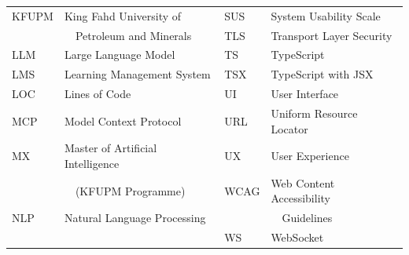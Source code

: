 \begin{tabular}{@{}l p{5.6cm} l p{5.6cm}@{}}
KFUPM & King Fahd University of                    & SUS   & System Usability Scale \\
      & ~~Petroleum and Minerals                   & TLS   & Transport Layer Security \\
LLM   & Large Language Model                       & TS    & TypeScript \\
LMS   & Learning Management System                 & TSX   & TypeScript with JSX \\
LOC   & Lines of Code                              & UI    & User Interface \\
MCP   & Model Context Protocol                     & URL   & Uniform Resource Locator \\
MX    & Master of Artificial Intelligence          & UX    & User Experience \\
      & ~~(KFUPM Programme)                        & WCAG  & Web Content Accessibility \\
NLP   & Natural Language Processing                &       & ~~Guidelines \\
      &                                            & WS    & WebSocket \\
\bottomrule
\end{tabular}
\normalsize

\clearpage
